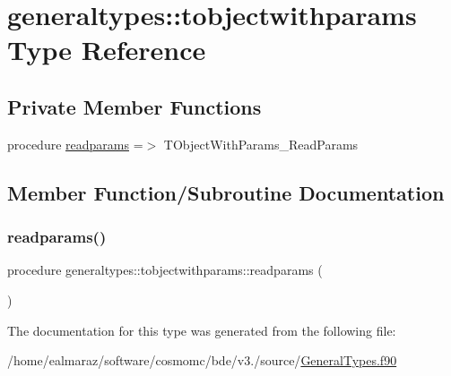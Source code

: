 \hypertarget{structgeneraltypes_1_1tobjectwithparams}{}\section{generaltypes\+:\+:tobjectwithparams Type Reference}
\label{structgeneraltypes_1_1tobjectwithparams}
\subsection*{Private Member Functions}
\begin{DoxyCompactItemize}
\item 
procedure \mbox{\hyperlink{structgeneraltypes_1_1tobjectwithparams_ae7b9c9736d3c2c6b7678a38276061bff}{readparams}} =$>$ T\+Object\+With\+Params\+\_\+\+Read\+Params
\end{DoxyCompactItemize}


\subsection{Member Function/\+Subroutine Documentation}
\mbox{\label{structgeneraltypes_1_1tobjectwithparams_ae7b9c9736d3c2c6b7678a38276061bff}} 
\subsubsection{\texorpdfstring{readparams()}{readparams()}}
{\footnotesize\ttfamily procedure generaltypes\+::tobjectwithparams\+::readparams (\begin{DoxyParamCaption}{ }\end{DoxyParamCaption})\hspace{0.3cm}{\ttfamily [private]}}



The documentation for this type was generated from the following file\+:\begin{DoxyCompactItemize}
\item 
/home/ealmaraz/software/cosmomc/bde/v3./source/\mbox{\hyperlink{GeneralTypes_8f90}{General\+Types.\+f90}}\end{DoxyCompactItemize}
